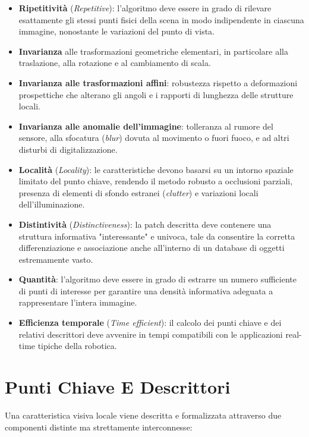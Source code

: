 ﻿\documentclass[11pt, a4paper]{article}
\begin{document}
\begin{itemize}
    \item \textbf{Ripetitività} (\emph{Repetitive}): l'algoritmo deve essere in grado di rilevare esattamente gli stessi punti fisici della scena in modo indipendente in ciascuna immagine, nonostante le variazioni del punto di vista.
    \item \textbf{Invarianza} alle trasformazioni geometriche elementari, in particolare alla traslazione, alla rotazione e al cambiamento di scala.
    \item \textbf{Invarianza alle trasformazioni affini}: robustezza rispetto a deformazioni prospettiche che alterano gli angoli e i rapporti di lunghezza delle strutture locali.
    \item \textbf{Invarianza alle anomalie dell'immagine}: tolleranza al rumore del sensore, alla sfocatura (\emph{blur}) dovuta al movimento o fuori fuoco, e ad altri disturbi di digitalizzazione.
    \item \textbf{Località} (\emph{Locality}): le caratteristiche devono basarsi su un intorno spaziale limitato del punto chiave, rendendo il metodo robusto a occlusioni parziali, presenza di elementi di sfondo estranei (\emph{clutter}) e variazioni locali dell'illuminazione.
    \item \textbf{Distintività} (\emph{Distinctiveness}): la patch descritta deve contenere una struttura informativa "interessante" e univoca, tale da consentire la corretta differenziazione e associazione anche all'interno di un database di oggetti estremamente vasto.
    \item \textbf{Quantità}: l'algoritmo deve essere in grado di estrarre un numero sufficiente di punti di interesse per garantire una densità informativa adeguata a rappresentare l'intera immagine.
    \item \textbf{Efficienza temporale} (\emph{Time efficient}): il calcolo dei punti chiave e dei relativi descrittori deve avvenire in tempi compatibili con le applicazioni real-time tipiche della robotica.
\end{itemize}

\newpage

\section{Punti Chiave E Descrittori}

Una caratteristica visiva locale viene descritta e formalizzata attraverso due componenti distinte ma strettamente interconnesse:
\end{document}
